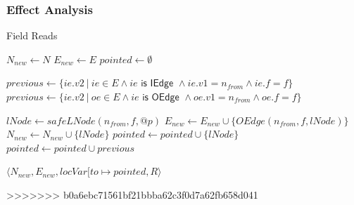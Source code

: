 \documentclass[hyperref={pdfpagelabels=false}]{beamer}
\begin{document}
\begin{frame}[fragile,shrink=20]
    \frametitle{Effect Analysis}
    \begin{algorithm}[H]
        \caption{Field Reads}\label{algo:pt:reads}
        \begin{algorithmic}[1]
            \State $N_{new} \gets N$
            \State $E_{new} \gets E$
            \State $pointed \gets \emptyset$

                \State $previous \gets \{ ie.v2 ~|~ ie \in E \land ie \textsf{ is IEdge } \land ie.v1 = n_{from} \land ie.f = f \}$
                    \State $previous \gets \{ ie.v2 ~|~ oe \in E \land ie \textsf{ is OEdge } \land oe.v1 = n_{from} \land oe.f = f \}$
                \EndIf

                    \State $lNode \gets safeLNode(n_{from}, f, @p)$
                    \State $E_{new} \gets E_{new} \cup \{ OEdge(n_{from}, f, lNode) \}$
                    \State $N_{new} \gets N_{new} \cup \{ lNode \}$
                    \State $pointed \gets pointed \cup \{ lNode \}$
                \Else
                    \State $pointed \gets pointed \cup previous$
                \EndIf
            \EndFor

            \State \Return $\langle N_{new}, E_{new}, locVar[ to \mapsto pointed, R \rangle$
        \EndFunction
        \end{algorithmic}
    \end{algorithm}
\end{frame}
>>>>>>> b0a6ebc71561bf21bbba62c3f0d7a62fb658d041
\end{document}
